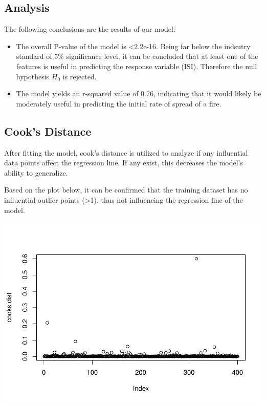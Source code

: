 \documentclass[conference,final,]{IEEEtran}
\makeatletter
\def\maxwidth{\ifdim\Gin@nat@width>\linewidth\linewidth
\else\Gin@nat@width\fi}
\let\Oldincludegraphics\includegraphics
\renewcommand{\includegraphics}[1]{\Oldincludegraphics[width=\maxwidth]{#1}}
\makeatother
\begin{document}
\hypertarget{analysis}{%
\subsection{Analysis}\label{analysis}}

The following conclusions are the results of our model:

\begin{itemize}
\item
  The overall P-value of the model is \textless{}2.2e-16. Being far
  below the indsutry standard of 5\% significance level, it can be
  concluded that at least one of the features is useful in predicting
  the response variable (ISI). Therefore the null hypothesis \(H_{0}\)
  is rejected.
\item
  The model yields an r-squared value of 0.76, indicating that it would
  likely be moderately useful in predicting the initial rate of spread
  of a fire.
\end{itemize}

\hypertarget{cooks-distance}{%
\subsection{Cook's Distance}\label{cooks-distance}}

After fitting the model, cook's distance is utilized to analyze if any
influential data points affect the regression line. If any exist, this
decreases the model's ability to generalize.

Based on the plot below, it can be confirmed that the training dataset
has no influential outlier points (\textgreater{}1), thus not
influencing the regression line of the model.

\includegraphics{forest_fires_files/figure-latex/unnamed-chunk-8-1.pdf}
\end{document}

